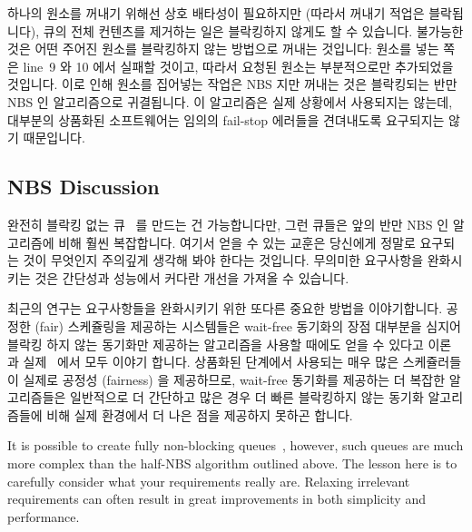하나의 원소를 꺼내기 위해선 상호 배타성이 필요하지만 (따라서 꺼내기 적업은
블락됩니다), 큐의 전체 컨텐츠를 제거하는 일은 블락킹하지 않게도 할 수 있습니다.
불가능한 것은 어떤 주어진 원소를 블락킹하지 않는 방법으로 꺼내는 것입니다:
원소를 넣는 쪽은 line~9 와 10 에서 실패할 것이고, 따라서 요청된 원소는
부분적으로만 추가되었을 것입니다.
이로 인해 원소를 집어넣는 작업은 NBS 지만 꺼내는 것은 블락킹되는 반만 NBS 인
알고리즘으로 귀결됩니다.
이 알고리즘은 실제 상황에서 사용되지는 않는데, 대부분의 상품화된 소프트웨어는
임의의 fail-stop 에러들을 견뎌내도록 요구되지는 않기 때문입니다.
\iffalse

Although mutual exclusion is required to dequeue a single element
(so that dequeue is blocking), it is possible to carry out a non-blocking
removal of the entire contents of the queue.
What is not possible is to dequeue any given element in a non-blocking
manner: The enqueuer might have failed between lines~9 and~10 of the
listing, so that the element in question is only partially enqueued.
This results in a half-NBS algorithm where enqueues are NBS but
dequeues are blocking.
This algorithm is nevertheless used in practice, in part because
most production software is not required to tolerate arbitrary fail-stop
errors.
\fi

\subsection{NBS Discussion}
\label{sec:advsync:NBS Discussion}

완전히 블락킹 없는 큐~\cite{MichaelScott96} 를 만드는 건 가능합니다만, 그런
큐들은 앞의 반만 NBS 인 알고리즘에 비해 훨씬 복잡합니다.
여기서 얻을 수 있는 교훈은 당신에게 정말로 요구되는 것이 무엇인지 주의깊게
생각해 봐야 한다는 것입니다.
무의미한 요구사항을 완화시키는 것은 간단성과 성능에서 커다란 개선을 가져올 수
있습니다.

최근의 연구는 요구사항들을 완화시키기 위한 또다른 중요한 방법을 이야기합니다.
공정한 (fair) 스케쥴링을 제공하는 시스템들은 wait-free 동기화의 장점 대부분을
심지어 블락킹 하지 않는 동기화만 제공하는 알고리즘을 사용할 때에도 얻을 수
있다고 이론~\cite{DanAlitarh2013PracticalProgress} 과
실제~\cite{SamyAlBahra2013NBS} 에서 모두 이야기 합니다.
상품화된 단계에서 사용되는 매우 많은 스케쥴러들이 실제로 공정성 (fairness) 을
제공하므로, wait-free 동기화를 제공하는 더 복잡한 알고리즘들은 일반적으로 더
간단하고 많은 경우 더 빠른 블락킹하지 않는 동기화 알고리즘들에 비해 실제
환경에서 더 나은 점을 제공하지 못하곤 합니다.
\iffalse

It is possible to create fully non-blocking queues~\cite{MichaelScott96},
however, such queues are much more complex than the half-NBS algorithm
outlined above.
The lesson here is to carefully consider what your requirements really are.
Relaxing irrelevant requirements can often result in great
improvements in both simplicity and performance.

